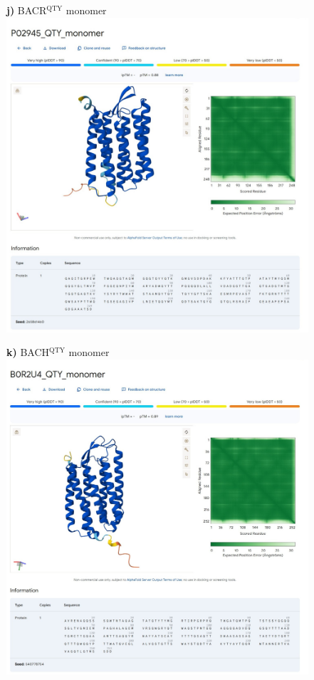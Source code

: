 \documentclass[fleqn,12pt]{supp}
\begin{document}
\newpage
\begin{figure}[H]
    \textbf{j)} BACR$^{\textrm{QTY}}$ monomer \\
    \includegraphics[width=\linewidth]{FigureS2j.jpg}
\end{figure}

\newpage
\begin{figure}[H]
    \textbf{k)} BACH$^{\textrm{QTY}}$ monomer \\
    \includegraphics[width=\linewidth]{FigureS2k.jpg}
\end{figure}
\end{document}
